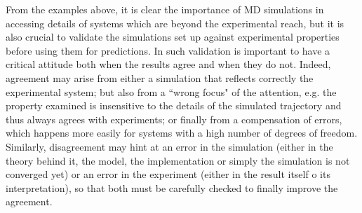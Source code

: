 From the examples above, it is clear the importance of MD simulations in accessing details of systems which are beyond the experimental reach, but it is also crucial to validate the simulations set up against experimental properties before using them for predictions.
%
In such validation is important to have a critical attitude both when the results agree and when they do not.
%
Indeed, agreement may arise from either a simulation that reflects correctly the experimental system; but also from a ``wrong focus" of the attention, e.g. the property examined is insensitive to the details of the simulated trajectory and thus always agrees with experiments; or finally from a compensation of errors, which happens more easily for systems with a high number of degrees of freedom.
%
Similarly, disagreement may hint at an error in the simulation (either in the theory behind it, the model, the implementation or simply the simulation is not converged yet) or an error in the experiment (either in the result itself o its interpretation), so that both must be carefully checked to finally improve the agreement.
